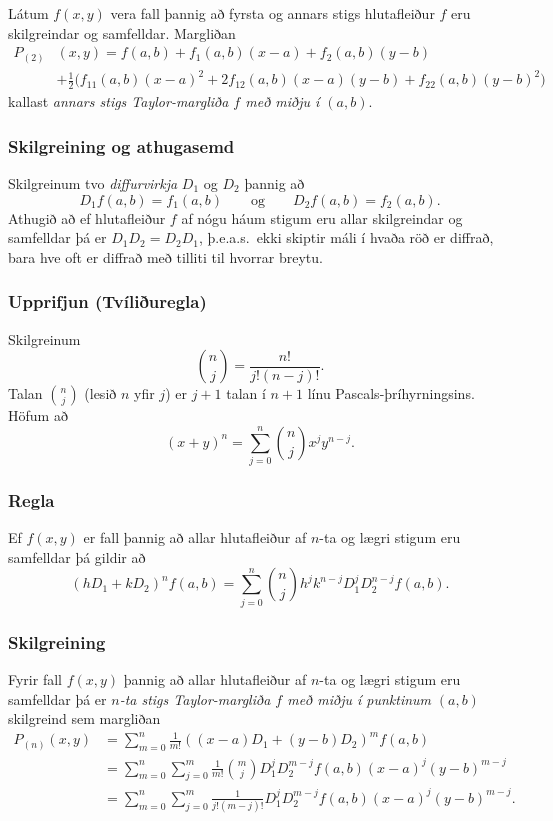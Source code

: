 Látum $f(x,y)$ vera fall þannig að fyrsta og annars
stigs hlutafleiður $f$ eru skilgreindar og samfelldar.  Margliðan
\begin{align*}P_{(2)}&(x,y)=f(a,b)+f_1(a,b)(x-a)+f_2(a,b)(y-b)\\
&+\frac{1}{2}\big(f_{11}(a,b)(x-a)^2+
2f_{12}(a,b)(x-a)(y-b)+f_{22}(a,b)(y-b)^2\big)
\end{align*}
kallast {\em annars stigs Taylor-margliða $f$ með miðju í $(a,b)$}.  



\subsubsection{Skilgreining og athugasemd }
Skilgreinum tvo {\em diffurvirkja} $D_1$ og $D_2$ þannig að 
$$D_1f(a,b)=f_1(a,b)\qquad\mbox{og}\qquad
D_2f(a,b)=f_2(a,b).$$
Athugið að ef hlutafleiður $f$ af nógu háum stigum eru allar skilgreindar og samfelldar þá er $D_1D_2=D_2D_1$, þ.e.a.s.\ ekki skiptir máli í hvaða röð er diffrað, bara hve oft er diffrað með tilliti til hvorrar breytu.




\subsubsection{Upprifjun (Tvíliðuregla)}
Skilgreinum 
$${n\choose j}=\frac{n!}{j!(n-j)!}.$$
Talan ${n\choose j}$ (lesið $n$ yfir $j$) er $j+1$ talan í $n+1$ línu Pascals-þríhyrningsins.
 Höfum að 
$$(x+y)^n=\sum_{j=0}^n \textstyle{n\choose j}x^jy^{n-j}.$$




\subsubsection{Regla }

Ef $f(x,y)$ er fall þannig að allar hlutafleiður af $n$-ta og lægri stigum eru samfelldar þá gildir að 
$$(hD_1+kD_2)^nf(a,b)=\sum_{j=0}^n \textstyle{n\choose j}
h^jk^{n-j}D_1^jD_2^{n-j}f(a,b).$$



\subsubsection{Skilgreining }
Fyrir fall $f(x,y)$ þannig að allar
hlutafleiður af $n$-ta og lægri stigum eru samfelldar þá er {\em $n$-ta
stigs Taylor-margliða $f$ með miðju í punktinum} $(a,b)$ skilgreind sem
margliðan  
\begin{align*}
P_{(n)}(x,y)&= \sum_{m=0}^n \frac{1}{m!}((x-a)D_1+(y-b)D_2)^m f(a,b)\\
&=\sum_{m=0}^n\sum_{j=0}^m \frac{1}{m!}\textstyle{m\choose j}
D_1^jD_2^{m-j}f(a,b)(x-a)^j(y-b)^{m-j}\\
&=\sum_{m=0}^n\sum_{j=0}^m \frac{1}{j!(m-j)!}
D_1^jD_2^{m-j}f(a,b)(x-a)^j(y-b)^{m-j}.
\end{align*}




